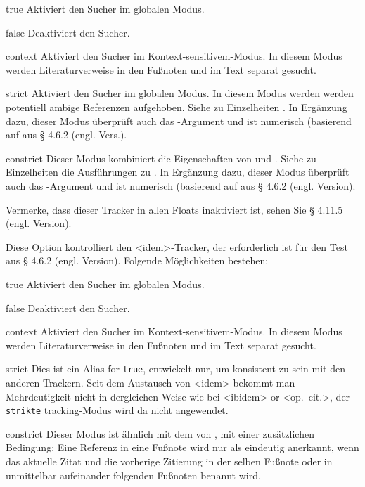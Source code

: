 \documentclass{ltxdockit}[2011/03/25]
\begin{document}
\begin{optionlist}
\begin{valuelist} 
\item[true] Aktiviert den Sucher im globalen Modus.
\item[false] Deaktiviert den Sucher.  
\item[context] Aktiviert den Sucher im
Kontext-sensitivem-Modus. In diesem Modus werden Literaturverweise in den
Fußnoten und im Text separat gesucht. 
\item[strict] Aktiviert den Sucher im
globalen Modus. In diesem Modus werden werden potentiell ambige Referenzen
aufgehoben. Siehe zu Einzelheiten . In Ergänzung
dazu, dieser Modus überprüft auch das -Argument und ist
numerisch (basierend auf  aus %
    § 4.6.2 (engl. Vers.).
\item[constrict]
Dieser Modus kombiniert die Eigenschaften von  und .
Siehe zu Einzelheiten die Ausführungen zu . In Ergänzung
dazu, dieser Modus überprüft auch das -Argument und ist
numerisch (basierend auf  aus § 4.6.2 (engl. Version). %

Vermerke, dass dieser Tracker in allen Floats inaktiviert ist, sehen Sie
§ 4.11.5 (engl. Version). %
\end{valuelist}



Diese Option kontrolliert den <idem>-Tracker, der erforderlich ist für den
 Test aus § 4.6.2 (engl. Version). %
Folgende Möglichkeiten bestehen:

\begin{valuelist} 
\item[true] Aktiviert den Sucher im globalen Modus.
\item[false] Deaktiviert den Sucher.  
\item[context] Aktiviert den Sucher im
Kontext-sensitivem-Modus. In diesem Modus werden Literaturverweise in den
Fußnoten und im Text separat gesucht.  
\item[strict] Dies ist ein Alias for \texttt{true}, entwickelt nur, um konsistent
zu sein mit den anderen Trackern. Seit dem Austausch von <idem> bekommt man
Mehrdeutigkeit nicht in dergleichen Weise wie bei <ibidem> or <op.~cit.>, der
\texttt{strikte} tracking-Modus wird da nicht angewendet.
\item[constrict] Dieser Modus ist ähnlich mit dem von , mit einer
zusätzlichen Bedingung: Eine Referenz in eine Fußnote wird nur
als eindeutig anerkannt, wenn das aktuelle Zitat und die vorherige Zitierung in der
selben Fußnote oder in unmittelbar aufeinander folgenden Fußnoten benannt
wird.
 \end{valuelist}


\end{optionlist}
\end{document}

